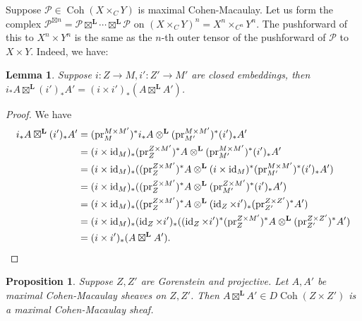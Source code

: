 \documentclass{amsart}
\theoremstyle{plain}
\newtheorem{lemma}[theorem]{Lemma}
\newtheorem{proposition}[theorem]{Proposition}
\theoremstyle{definition}
\theoremstyle{remark}
\begin{document}
    Suppose $\mathcal P\in\operatorname{Coh}(X\times_C Y)$ is maximal Cohen-Macaulay.
    Let us form the complex $\mathcal P^{\boxtimes n}=\mathcal P\boxtimes^{\mathbf L}\cdots\boxtimes^{\mathbf L}\mathcal P$ on $(X\times_CY)^n=X^n\times_{C^n}Y^n$.
    The pushforward of this to $X^n\times Y^n$ is the same as the $n$-th outer tensor of the pushforward of $\mathcal P$ to $X\times Y$.
    Indeed, we have:
    \begin{lemma}\label{closed_embeddings_outer}
        Suppose $i:Z\to M,i':Z'\to M'$ are closed embeddings, then $i_\ast A\boxtimes^{\mathbf L}(i')_\ast A'=(i\times i')_\ast(A\boxtimes^{\mathbf L}A')$.
    \end{lemma}
    \begin{proof}
        We have
        \begin{align*}
            i_\ast A\boxtimes^{\mathbf L}(i')_\ast A'&=(\operatorname{pr}_M^{M\times M'})^\ast i_\ast A\otimes^{\mathbf L}(\operatorname{pr}_{M'}^{M\times M'})^\ast (i')_\ast A'\\
            &=(i\times\operatorname{id}_M)_\ast(\operatorname{pr}_{Z}^{Z\times M'})^\ast A\otimes^{\mathbf L}(\operatorname{pr}_{M'}^{M\times M'})^\ast (i')_\ast A'\\
            &=(i\times\operatorname{id}_M)_\ast((\operatorname{pr}_{Z}^{Z\times M'})^\ast A\otimes^{\mathbf L}(i\times\operatorname{id}_M)^\ast(\operatorname{pr}_{M'}^{M\times M'})^\ast (i')_\ast A')\\
            &=(i\times\operatorname{id}_M)_\ast((\operatorname{pr}_{Z}^{Z\times M'})^\ast A\otimes^{\mathbf L}(\operatorname{pr}_{M'}^{Z\times M'})^\ast (i')_\ast A')\\
            &=(i\times\operatorname{id}_M)_\ast((\operatorname{pr}_{Z}^{Z\times M'})^\ast A\otimes^{\mathbf L}(\operatorname{id}_Z\times i')_\ast(\operatorname{pr}_{Z'}^{Z\times Z'})^\ast A')\\
            &=(i\times\operatorname{id}_M)_\ast(\operatorname{id}_Z\times i')_\ast((\operatorname{id}_Z\times i')^\ast(\operatorname{pr}_{Z}^{Z\times M'})^\ast A\otimes^{\mathbf L}(\operatorname{pr}_{Z'}^{Z\times Z'})^\ast A')\\
            &=(i\times i')_\ast(A\boxtimes^{\mathbf L}A').\qedhere
        \end{align*}
    \end{proof}
    \begin{proposition}\label{mcm_outer_tensor}
        Suppose $Z,Z'$ are Gorenstein and projective.
        Let $A,A'$ be maximal Cohen-Macaulay sheaves on $Z,Z'$.
        Then $A\boxtimes^{\mathbf L}A'\in D\operatorname{Coh}(Z\times Z')$ is a maximal Cohen-Macaulay sheaf.
    \end{proposition}
\end{document}
